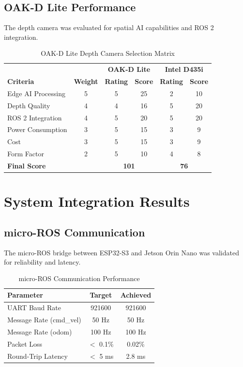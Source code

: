 \subsection{OAK-D Lite Performance}

The depth camera was evaluated for spatial AI capabilities and ROS 2 integration.

\begin{table}[H]
\centering
\caption{OAK-D Lite Depth Camera Selection Matrix}
\label{tab:camera_selection}
\begin{tabular}{|l|c|c|c|c|c|}
\hline
 & & \multicolumn{2}{c|}{\textbf{OAK-D Lite}} & \multicolumn{2}{c|}{\textbf{Intel D435i}} \\
\textbf{Criteria} & \textbf{Weight} & \textbf{Rating} & \textbf{Score} & \textbf{Rating} & \textbf{Score} \\
\hline
Edge AI Processing & 5 & 5 & 25 & 2 & 10 \\
Depth Quality & 4 & 4 & 16 & 5 & 20 \\
ROS 2 Integration & 4 & 5 & 20 & 5 & 20 \\
Power Consumption & 3 & 5 & 15 & 3 & 9 \\
Cost & 3 & 5 & 15 & 3 & 9 \\
Form Factor & 2 & 5 & 10 & 4 & 8 \\
\hline
\textbf{Final Score} & & \multicolumn{2}{c|}{\textbf{101}} & \multicolumn{2}{c|}{\textbf{76}} \\
\hline
\end{tabular}
\end{table}

\section{System Integration Results}
\label{sec:integration_results}

\subsection{micro-ROS Communication}

The micro-ROS bridge between ESP32-S3 and Jetson Orin Nano was validated for reliability and latency.

\begin{table}[H]
\centering
\caption{micro-ROS Communication Performance}
\label{tab:microros_performance}
\begin{tabular}{|l|c|c|}
\hline
\textbf{Parameter} & \textbf{Target} & \textbf{Achieved} \\
\hline
UART Baud Rate & 921600 & 921600 \\
Message Rate (cmd\_vel) & 50 Hz & 50 Hz \\
Message Rate (odom) & 100 Hz & 100 Hz \\
Packet Loss & $<$ 0.1\% & 0.02\% \\
Round-Trip Latency & $<$ 5 ms & 2.8 ms \\
\hline
\end{tabular}
\end{table}

